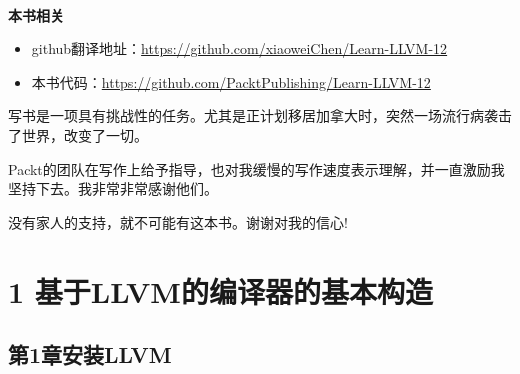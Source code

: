 \documentclass[11pt,a4paper,UTF8]{ctexart}
\begin{document}
	
	\hspace*{\fill} \\ %
	\noindent\textbf{本书相关}\ \par
	\begin{itemize}
		\item github翻译地址：\url{https://github.com/xiaoweiChen/Learn-LLVM-12}
		\item 本书代码：\url{https://github.com/PacktPublishing/Learn-LLVM-12}
	\end{itemize}
	\newpage
	
	
	\begin{center}
		\vspace*{\fill}
		写书是一项具有挑战性的任务。尤其是正计划移居加拿大时，突然一场流行病袭击了世界，改变了一切。\par
		
		\hspace*{\fill} \par
		
		Packt的团队在写作上给予指导，也对我缓慢的写作速度表示理解，并一直激励我坚持下去。我非常非常感谢他们。\par
		
		\hspace*{\fill} \par
		
		没有家人的支持，就不可能有这本书。谢谢对我的信心!\par
		
		\vspace*{\fill}
	\end{center}
	
	\newpage
	
	\pagestyle{empty}
	
	
	\tableofcontents
	\newpage
	
	
	\color{white}
	\section*{ 1 基于LLVM的编译器的基本构造}
	\pagecolor{mygray}
	
	\color{black}
	\pagecolor{white}
	
	\subsection*{ 第1章\hspace{0.5cm}安装LLVM}
	
	
\end{document}
